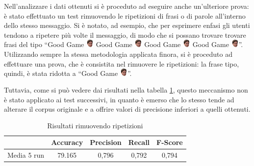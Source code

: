 \documentclass[a4paper,12pt,openright,twoside]{report}
\theoremstyle{definition}
\begin{document}
Nell'analizzare i dati ottenuti si è proceduto ad eseguire anche un'ulteriore prova:
è stato effettuato un test rimuovendo le ripetizioni di frasi o di parole all'interno dello stesso messaggio.
Si è notato, ad esempio, che per esprimere enfasi gli utenti tendono a ripetere più volte il messaggio,
di modo che si possano trovare
trovare frasi del tipo ``Good Game \includegraphics[height=0.4cm, width=0.4cm]{Immagini/Emoticons/kappahd.png}
Good Game \includegraphics[height=0.4cm, width=0.4cm]{Immagini/Emoticons/kappahd.png} Good Game
\includegraphics[height=0.4cm, width=0.4cm]{Immagini/Emoticons/kappahd.png} Good Game \includegraphics[height=0.4cm, width=0.4cm]{Immagini/Emoticons/kappahd.png}''.
Utilizzando sempre la stessa metodologia applicata finora, 
si è proceduto ad effettuare una prova, che è consistita nel rimuovere le ripetizioni:
la frase tipo, quindi, è stata ridotta a ``Good Game \includegraphics[height=0.4cm, width=0.4cm]{Immagini/Emoticons/kappahd.png}''.

Tuttavia, come si può vedere dai risultati nella tabella \ref{tab:analisiCongiunteNoRip},
questo meccanismo non è stato applicato ai test successivi, in quanto
è emerso che lo stesso tende ad alterare il corpus originale e a offrire
valori di precisione inferiori a quelli ottenuti.

\begin{table}[H]
\begin{center}
\begin{tabular}{|c|c|c|c|c|}
\hline
 & Accuracy & Precision & Recall & F-Score\\
\hline
Media 5 run & 79.165 &  0,796 & 0,792 & 0,794 \\
\hline
\end{tabular}
\end{center}
\caption{Risultati rimuovendo ripetizioni}
\label{tab:analisiCongiunteNoRip}
\end{table}
\end{document}
